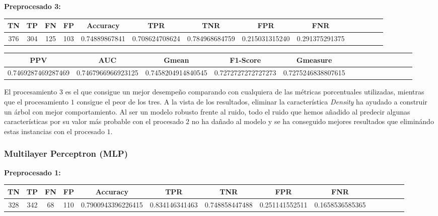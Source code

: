 \documentclass[a4]{article}
\begin{document}
\newpage
\textbf{Preprocesado 3:}
\begin{center}
\begin{tabular}{|c|c|c|c|c|c|c|c|c|c|c|c|c|c|}
\hline
\multicolumn{1}{|c|}{\textbf{TN}}& \textbf{TP} & \textbf{FN} & \textbf{FP} & \textbf{Accuracy} & \textbf{TPR} & \textbf{TNR} & \textbf{FPR} &\textbf{FNR} \\ \hline
  376 & 304 & 125 & 103 & 0.74889867841 & 0.708624708624 & 0.784968684759 & 0.215031315240 & 0.291375291375 \\ \hline
\end{tabular}
\end{center}

\begin{center}
\begin{tabular}{|c|c|c|c|c|c|c|c|c|c|c|c|c|c|}
\hline
\multicolumn{1}{|c|}{\textbf{PPV}} & \textbf{AUC} & \textbf{Gmean} & \textbf{F1-Score} & \textbf{Gmeasure}  \\ \hline
  0.7469287469287469 & 0.7467966966923125 & 0.7458204914840545 & 0.7272727272727273 & 0.7275246838807615 \\ \hline
\end{tabular}
\end{center}

\vspace{1mm}

El procesamiento $3$ es el que consigue un mejor desempeño comparando con cualquiera de las métricas porcentuales utilizadas, mientras que el procesamiento $1$ consigue el peor de los tres. A la vista de los resultados, eliminar la característica \textit{Density} ha ayudado a construir un árbol con mejor comportamiento. Al ser un modelo robusto frente al ruido, todo el ruido que hemos añadido al predecir algunas características por su valor más probable con el procesado $2$ no ha dañado al modelo y se ha conseguido mejores resultados que eliminándo estas instancias con el procesado $1$.

\subsubsection{Multilayer Perceptron (MLP)}

\textbf{Preprocesado 1:}
\begin{center}
\begin{tabular}{|c|c|c|c|c|c|c|c|c|c|c|c|c|c|}
\hline
\multicolumn{1}{|c|}{\textbf{TN}}& \textbf{TP} & \textbf{FN} & \textbf{FP} & \textbf{Accuracy} & \textbf{TPR} & \textbf{TNR} & \textbf{FPR} &\textbf{FNR} \\ \hline
  328 & 342 & 68 & 110 & 0.7900943396226415 & 0.834146341463 & 0.748858447488 & 0.251141552511 & 0.1658536585365 \\ \hline
\end{tabular}
\end{center}
\end{document}

